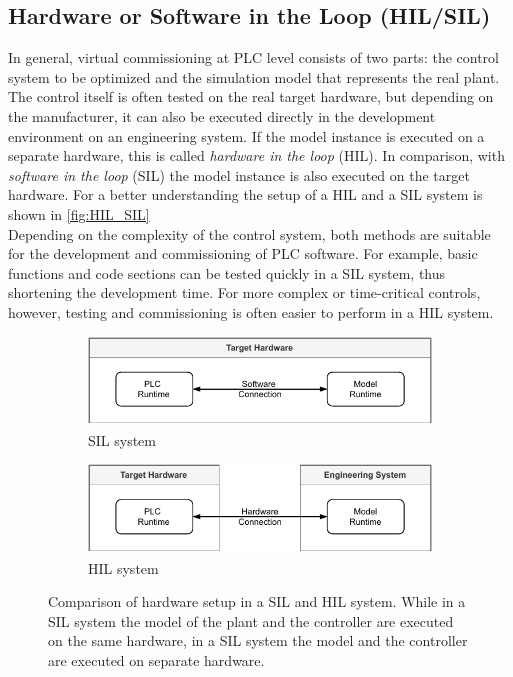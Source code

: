 \subsection{Hardware or Software in the Loop (HIL/SIL)}
    In general, virtual commissioning at PLC level consists of two parts: the control system to be optimized and the simulation model that represents the real plant. The control itself is often tested on the real target hardware, but depending on the manufacturer, it can also be executed directly in the development environment on an engineering system. If the model instance is executed on a separate hardware, this is called \textit{hardware in the loop} (\acs{HIL}). In comparison, with \textit{software in the loop} (\acs{SIL}) the model instance is also executed on the target hardware. For a better understanding the setup of a HIL and a SIL system is shown in \autoref{fig:HIL_SIL}\\
    Depending on the complexity of the control system, both methods are suitable for the development and commissioning of PLC software. For example, basic functions and code sections can be tested quickly in a SIL system, thus shortening the development time. For more complex or time-critical controls, however, testing and commissioning is often easier to perform in a HIL system. \\
	\begin{figure}[htp]
		\centering
		\begin{subfigure}{.95\textwidth}
			\centering
			\includegraphics{figures/HilSilComparisonSIL.pdf}
			\caption{SIL system}
		\end{subfigure}
		\vspace{3mm}
		
		\begin{subfigure}{.95\textwidth}
			\centering
		    \includegraphics{figures/HilSilComparisonHIL.pdf}
			\caption{HIL system}
		\end{subfigure}
		\caption[Comparison of hardware setup in a SIL and HIL system.]{Comparison of hardware setup in a SIL and HIL system. While in a SIL system the model of the plant and the controller are executed on the same hardware, in a SIL system the model and the controller are executed on separate hardware.}
		\label{fig:HIL_SIL}
	\end{figure}
    
